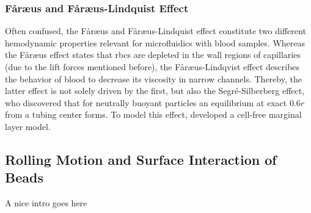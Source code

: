 \subsubsection{F\aa{}r\ae{}us and F\aa{}r\ae{}us-Lindquist Effect}
Often confused, the F\aa{}r\ae{}us and F\aa{}r\ae{}us-Lindquist effect constitute two different hemodynamic properties relevant for microfluidics with blood samples. Whereas the  F\aa{}r\ae{}us effect states that \glspl{rbc} are depleted in the wall regions of capillaries (due to the lift forces mentioned before), the F\aa{}r\ae{}us-Lindqvist effect describes the behavior of blood to decrease its viscosity in narrow channels.\cite{lit:fluid:faraeus, lit:fluid:faraeuslinquvist} Thereby, the latter effect is not solely driven by the first, but also the Segr\'{e}-Silberberg effect, who discovered that for neutrally buoyant particles an equilibrium at exact $0.6r$ from a tubing center forms.\cite{lit:fluid:silberbereffect} To model this effect, \citet{lit:fluid:cell-free-model} developed a cell-free marginal layer model.


\subsection{Rolling Motion and Surface Interaction of Beads}
A nice intro goes here
